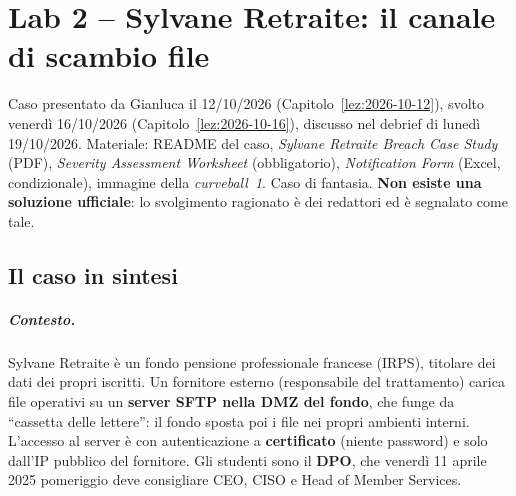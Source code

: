 \chapter{Lab 2 -- Sylvane Retraite: il canale di scambio file}
\label{lab:02}

\begin{nota}
Caso presentato da Gianluca il 12/10/2026 (Capitolo~\ref{lez:2026-10-12}), svolto venerdì 16/10/2026
(Capitolo~\ref{lez:2026-10-16}), discusso nel debrief di lunedì 19/10/2026. Materiale: README del caso,
\emph{Sylvane Retraite Breach Case Study} (PDF), \emph{Severity Assessment Worksheet} (obbligatorio),
\emph{Notification Form} (Excel, condizionale), immagine della \emph{curveball~1}. Caso di fantasia.
\textbf{Non esiste una soluzione ufficiale}: lo svolgimento ragionato è dei redattori ed è segnalato
come tale.
\end{nota}

\section{Il caso in sintesi}

\paragraph{Contesto.} Sylvane Retraite è un fondo pensione professionale francese (IRPS), titolare
dei dati dei propri iscritti. Un fornitore esterno (responsabile del trattamento) carica file
operativi su un \textbf{server SFTP nella DMZ del fondo}, che funge da ``cassetta delle lettere'':
il fondo sposta poi i file nei propri ambienti interni. L'accesso al server è con autenticazione a
\textbf{certificato} (niente password) e solo dall'IP pubblico del fornitore. Gli studenti sono il
\textbf{DPO}, che venerdì 11 aprile 2025 pomeriggio deve consigliare CEO, CISO e Head of Member
Services.

